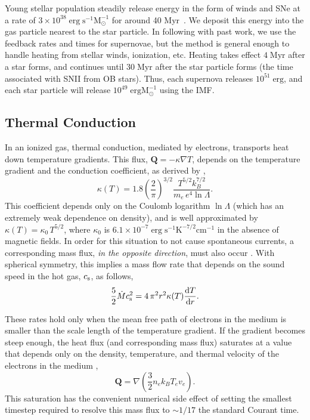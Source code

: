 Young stellar population steadily release energy in the form of winds and SNe at
a rate of $3\times 10^{38}\;\mathrm{erg\; s^{-1} M_\odot^{-1}}$ for around 40
Myr~\citep{Leitherer1999}. We deposit this energy into the gas particle nearest
to the star particle.  In following with past work, we use the feedback rates
and times for supernovae, but the method is general enough to handle heating
from stellar winds, ionization, etc.  Heating takes effect
$4\;\mathrm{Myr}$ after a star forms, and continues until $30\;\mathrm{Myr}$
after the star particle forms (the time associated with SNII from OB stars).  Thus,
each supernova releases $10^{51}\;\mathrm{erg}$, and each star particle will
release $10^{49}\;\mathrm{erg M^{-1}_\odot}$ using the \citet{Chabrier2003} IMF.

\subsection{Thermal Conduction}
In an ionized gas, thermal conduction, mediated by electrons,
transports heat down temperature gradients.  This flux, $\mathbf{Q} =
-\kappa\nabla T$, depends on the temperature gradient and the conduction
coefficient, as derived by \citet{Cowie1977},
\begin{equation} \label{coefficient}
    \kappa(T) = 1.8\left(\frac{2}{\pi}\right)^{3/2}\frac{T^{5/2}k_B^{7/2}}{m_e\,e^4\ln\Lambda}.
\end{equation}
This coefficient depends only on the Coulomb logarithm $\ln\Lambda$ (which has
an extremely weak dependence on density), and is well approximated by $\kappa(T)
= \kappa_0\,T^{5/2}$, where $\kappa_0$ is $6.1\times10^{-7}\;\mathrm{erg\;s^{-1}
K^{-7/2}cm^{-1}}$ in the absence of magnetic fields.  In order for this
situation to not cause spontaneous currents, a corresponding mass flux,
{\it in the opposite direction}, must also occur \citep{Cowie1977}.  With
spherical symmetry, this implies a mass flow rate that depends on the sound
speed in the hot gas, $c_{\rm s}$, as follows,
\begin{equation}\label{conservation}
    \frac{5}{2}\dot M c_{\rm s}^2 = 4\,\pi^2r^2\kappa(T)\frac{{\rm d}T}{{\rm d}r}.
\end{equation}

These rates hold only when the mean free path of electrons in the medium is
smaller than the scale length of the temperature gradient.  If the gradient
becomes steep enough, the heat flux (and corresponding mass flux) saturates at a
value that depends only on the density, temperature, and thermal velocity of the
electrons in the medium \citep{Cowie1977},
\begin{equation}\label{heatflux}
    \mathbf{Q} = \nabla\left(\frac{3}{2}n_ek_BT_ev_e\right).
\end{equation}
This saturation has the convenient numerical side effect of setting the smallest
timestep required to resolve this mass flux to $\sim 1/17$ the standard Courant
time.

